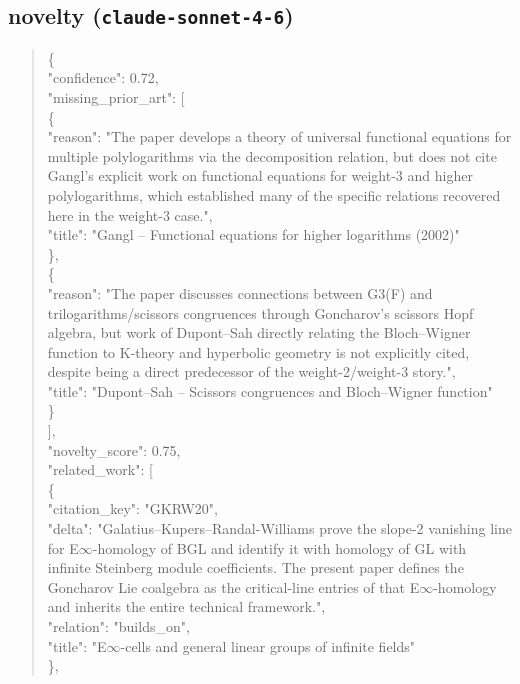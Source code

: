 \documentclass[11pt]{article}
\begin{document}
\subsection*{novelty (\texttt{claude-sonnet-4-6})}
\begin{quote}\small\ttfamily\raggedright
\{\\
  "confidence": 0.72,\\
  "missing\_prior\_art": [\\
    \{\\
      "reason": "The paper develops a theory of universal functional equations for multiple polylogarithms via the decomposition relation, but does not cite Gangl's explicit work on functional equations for weight-3 and higher polylogarithms, which established many of the specific relations recovered here in the weight-3 case.",\\
      "title": "Gangl -- Functional equations for higher logarithms (2002)"\\
    \},\\
    \{\\
      "reason": "The paper discusses connections between G3(F) and trilogarithms/scissors congruences through Goncharov's scissors Hopf algebra, but work of Dupont--Sah directly relating the Bloch--Wigner function to K-theory and hyperbolic geometry is not explicitly cited, despite being a direct predecessor of the weight-2/weight-3 story.",\\
      "title": "Dupont--Sah -- Scissors congruences and Bloch--Wigner function"\\
    \}\\
  ],\\
  "novelty\_score": 0.75,\\
  "related\_work": [\\
    \{\\
      "citation\_key": "GKRW20",\\
      "delta": "Galatius--Kupers--Randal-Williams prove the slope-2 vanishing line for E\ensuremath{\infty}-homology of BGL and identify it with homology of GL with infinite Steinberg module coefficients. The present paper defines the Goncharov Lie coalgebra as the critical-line entries of that E\ensuremath{\infty}-homology and inherits the entire technical framework.",\\
      "relation": "builds\_on",\\
      "title": "E\ensuremath{\infty}-cells and general linear groups of infinite fields"\\
    \},\\

\end{quote}
\end{document}
